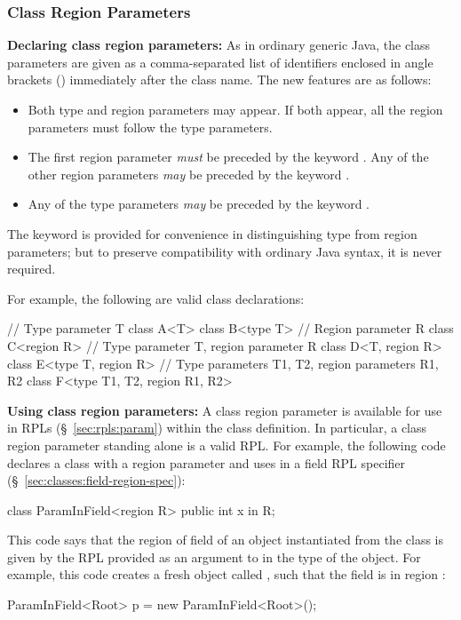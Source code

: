 \subsubsection{Class Region Parameters%
\label{sec:classes:params:class}}

\textbf{Declaring class region parameters:} As in ordinary generic
Java, the class parameters are given as a comma-separated list of
identifiers enclosed in angle brackets (\kwd{<>}) immediately after
the class name.  The new features are as follows:
%
\begin{itemize}
%
\item Both type and region parameters may appear.  If both appear, all
  the region parameters must follow the type parameters.
%
\item The first region parameter \emph{must} be preceded by the
  keyword .  Any of the other region parameters \emph{may}
  be preceded by the keyword .
%
\item Any of the type parameters \emph{may} be preceded by the keyword
  .
%
\end{itemize}
%
The keyword  is provided for convenience in distinguishing
type from region parameters; but to preserve compatibility with
ordinary Java syntax, it is never required.

For example, the following are valid class declarations:
%
\begin{dpjlisting}
// Type parameter T
class A<T> {}            
class B<type T> {}
// Region parameter R
class C<region R> {}
// Type parameter T, region parameter R
class D<T, region R> {}
class E<type T, region R> {}
// Type parameters T1, T2, region parameters R1, R2
class F<type T1, T2, region R1, R2> {}
\end{dpjlisting}

\noindent
\textbf{Using class region parameters:} A class region parameter is
available for use in RPLs (\S~\ref{sec:rpls:param}) within the class
definition.  In particular, a class region parameter standing alone is
a valid RPL.  For example, the following code declares a class
 with a region parameter  and uses  in
a field RPL specifier (\S~\ref{sec:classes:field-region-spec}):
%
\begin{dpjlisting}
class ParamInField<region R> {
    public int x in R;
}
\end{dpjlisting}
%
This code says that the region of field  of an object
instantiated from the  class is given by the RPL
provided as an argument to  in the type of the object.  For
example, this code creates a fresh  object called
, such that the field  is in region :
%
\begin{dpjlisting}
ParamInField<Root> p = new ParamInField<Root>();
\end{dpjlisting}

